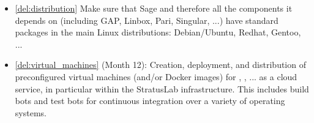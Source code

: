 \begin{Workpackage}{\thewpno}
\begin{WPDeliverables}


    \begin{itemize}




    \item \ref{del:distribution} Make sure that Sage and therefore all the
      components it depends on (including GAP, Linbox, Pari, Singular,
      ...)  have standard packages in the main Linux distributions:
      Debian/Ubuntu, Redhat, Gentoo, ...


    \item \ref{del:virtual_machines} (Month 12): Creation, deployment,
      and distribution of preconfigured virtual machines (and/or
      Docker images) for \Pari, \Sage, ... as a cloud service, in
      particular within the StratusLab infrastructure. This includes
      build bots and test bots for continuous integration over a
      variety of operating systems.


\end{itemize}
\end{WPDeliverables}
\end{Workpackage}
